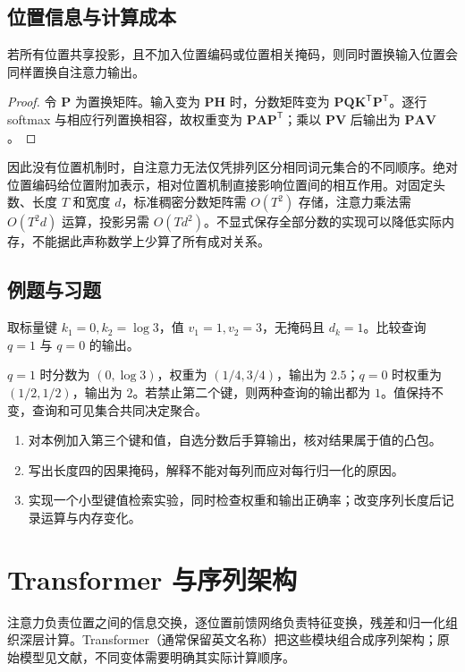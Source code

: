 \documentclass[UTF8,12pt,a4paper,fontset=fandol]{ctexbook}
\begin{document}
\section{位置信息与计算成本}
\begin{proposition}[无位置自注意力的置换等变性]
若所有位置共享投影，且不加入位置编码或位置相关掩码，则同时置换输入位置会同样置换自注意力输出。
\end{proposition}
\begin{proof}
令 $\mathbf P$ 为置换矩阵。输入变为 $\mathbf P\mathbf H$ 时，分数矩阵变为 $\mathbf P\mathbf Q\mathbf K^\mathsf T\mathbf P^\mathsf T$。逐行 softmax 与相应行列置换相容，故权重变为 $\mathbf P\mathbf A\mathbf P^\mathsf T$；乘以 $\mathbf P\mathbf V$ 后输出为 $\mathbf P\mathbf A\mathbf V$。
\end{proof}
因此没有位置机制时，自注意力无法仅凭排列区分相同词元集合的不同顺序。绝对位置编码给位置附加表示，相对位置机制直接影响位置间的相互作用。对固定头数、长度 $T$ 和宽度 $d$，标准稠密分数矩阵需 $O(T^2)$ 存储，注意力乘法需 $O(T^2d)$ 运算，投影另需 $O(Td^2)$。不显式保存全部分数的实现可以降低实际内存，不能据此声称数学上少算了所有成对关系。

\section{例题与习题}
\begin{example}[查询改变加权平均]
取标量键 $k_1=0,k_2=\log3$，值 $v_1=1,v_2=3$，无掩码且 $d_k=1$。比较查询 $q=1$ 与 $q=0$ 的输出。
\end{example}
\begin{solve}
$q=1$ 时分数为 $(0,\log3)$，权重为 $(1/4,3/4)$，输出为 $2.5$；$q=0$ 时权重为 $(1/2,1/2)$，输出为 $2$。若禁止第二个键，则两种查询的输出都为 $1$。值保持不变，查询和可见集合共同决定聚合。
\end{solve}
\begin{enumerate}
\item 对本例加入第三个键和值，自选分数后手算输出，核对结果属于值的凸包。
\item 写出长度四的因果掩码，解释不能对每列而应对每行归一化的原因。
\item 实现一个小型键值检索实验，同时检查权重和输出正确率；改变序列长度后记录运算与内存变化。
\end{enumerate}

\chapter{Transformer 与序列架构}
\label{chap:dl-transformer}
注意力负责位置之间的信息交换，逐位置前馈网络负责特征变换，残差和归一化组织深层计算。Transformer（通常保留英文名称）把这些模块组合成序列架构；原始模型见文献\cite{vaswani2017}，不同变体需要明确其实际计算顺序。
\end{document}
